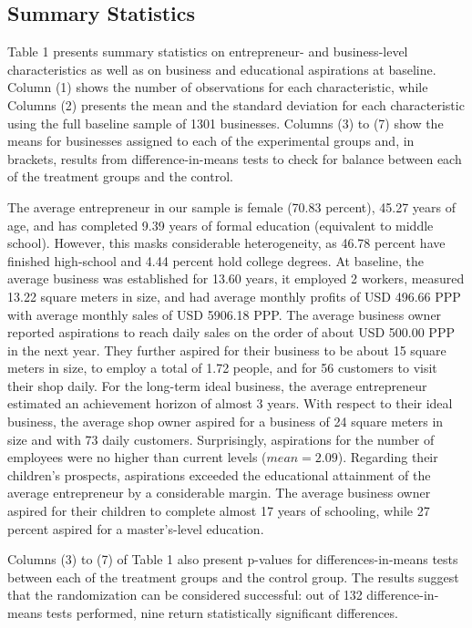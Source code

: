 \documentclass[11.5pt]{article}
\begin{document}
\subsection{Summary Statistics}

Table 1 presents summary statistics on entrepreneur- and business-level characteristics as well as on business and educational aspirations at baseline. Column (1) shows the number of observations for each characteristic, while Columns (2) presents the mean and the standard deviation for each characteristic using the full baseline sample of 1301 businesses. Columns (3) to (7) show the means for businesses assigned to each of the experimental groups and, in brackets, results from difference-in-means tests to check for balance between each of the treatment groups and the control.

The average entrepreneur in our sample is female (70.83 percent), 45.27 years of age, and has completed 9.39 years of formal education (equivalent to middle school). However, this masks considerable heterogeneity, as 46.78 percent have finished high-school and 4.44 percent hold college degrees. At baseline, the average business was established for 13.60 years, it employed 2 workers, measured 13.22 square meters in size, and had average monthly profits of USD 496.66 PPP with average monthly sales of USD 5906.18 PPP. The average business owner reported aspirations to reach daily sales on the order of about USD 500.00 PPP in the next year. They further aspired for their business to be about 15 square meters in size, to employ a total of 1.72 people, and for 56 customers to visit their shop daily. For the long-term ideal business, the average entrepreneur estimated an achievement horizon of almost 3 years. With respect to their ideal business, the average shop owner aspired for a business of 24 square meters in size and with 73 daily customers. Surprisingly, aspirations for the number of employees were no higher than current levels ($mean = 2.09$). Regarding their children's prospects, aspirations exceeded the educational attainment of the average entrepreneur by a considerable margin. The average business owner aspired for their children to complete almost 17 years of schooling, while 27 percent aspired for a master's-level education.

Columns (3) to (7) of Table 1 also present p-values for differences-in-means tests between each of the treatment groups and the control group. The results suggest that the randomization can be considered successful: out of 132 difference-in-means tests performed, nine return statistically significant differences.
\end{document}

